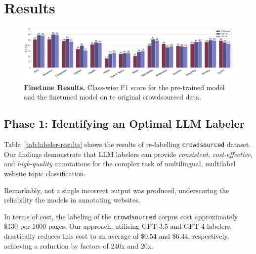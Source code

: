 \section{Results}

\begin{figure}[h]
    \centering
    \includegraphics[width=\textwidth]{./figures/finetune-results.pdf}
    \caption{\textbf{Finetune Results.} Class-wise F1 score for the pre-trained model and the finetuned model on te original crowdsourced data.}
    \label{fig:finetune-results}
\end{figure}


\subsection*{Phase 1: Identifying an Optimal LLM Labeler}

Table~\ref{tab:labeler-results} shows the results of re-labelling \texttt{crowdsourced} dataset. Our findings demonstrate that LLM labelers can provide \textit{consistent}, \textit{cost-effective}, and \textit{high-quality} annotations for the complex task of multilingual, multilabel website topic classification. 

Remarkably, not a single incorrect output was produced, underscoring the reliability the models in annotating websites.


In terms of cost, the labeling of the \texttt{crowdsourced} corpus cost approximately \$130 per 1000 pages. Our approach, utilising GPT-3.5 and GPT-4 labelers, drastically reduces this cost to an average of \$0.54 and \$6.44, respectively, achieving a reduction by factors of 240x and 20x.





